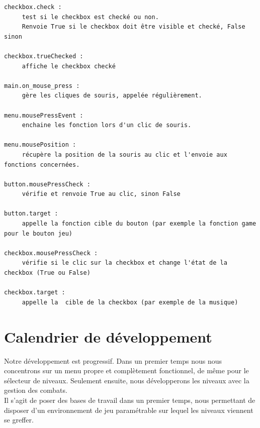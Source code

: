 \documentclass{article}
\begin{document}
\begin{verbatim}
checkbox.check :
     test si le checkbox est checké ou non.   
     Renvoie True si le checkbox doit être visible et checké, False sinon

checkbox.trueChecked :
     affiche le checkbox checké

main.on_mouse_press :
     gère les cliques de souris, appelée régulièrement.

menu.mousePressEvent :
     enchaine les fonction lors d'un clic de souris.

menu.mousePosition :
     récupère la position de la souris au clic et l'envoie aux fonctions concernées.

button.mousePressCheck :
     vérifie et renvoie True au clic, sinon False

button.target :
     appelle la fonction cible du bouton (par exemple la fonction game pour le bouton jeu)

checkbox.mousePressCheck :
     vérifie si le clic sur la checkbox et change l'état de la checkbox (True ou False)

checkbox.target :
     appelle la  cible de la checkbox (par exemple de la musique)

\end{verbatim}

 

\newpage
\section{Calendrier de développement}
Notre développement est progressif. Dans un premier temps nous nous concentrons sur un menu propre et complètement fonctionnel, de même pour le sélecteur de niveaux. Seulement ensuite, nous développerons les niveaux avec la gestion des combats.\\
	
Il s'agit de poser des bases de travail dans un premier temps, nous permettant de disposer d'un environnement de jeu paramétrable sur lequel les niveaux viennent se greffer.
\end{document}
